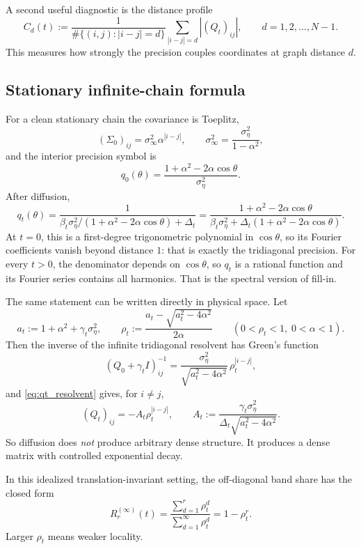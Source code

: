 \documentclass[11pt]{article}
\newcommand{\Id}{I}
\newcommand{\abs}[1]{\left| #1 \right|}
\begin{document}
A second useful diagnostic is the distance profile
\begin{equation}\label{eq:Cd_def}
C_d(t):=
\frac{1}{\#\{(i,j):\abs{i-j}=d\}}
\sum_{\abs{i-j}=d}\abs{(Q_t)_{ij}},
\qquad d=1,2,\dots,N-1.
\end{equation}
This measures how strongly the precision couples coordinates at graph distance $d$.

\subsection{Stationary infinite-chain formula}
For a clean stationary chain the covariance is Toeplitz,
\[
(\Sigma_0)_{ij}=\sigma_\infty^2\alpha^{\abs{i-j}},
\qquad
\sigma_\infty^2=\frac{\sigma_\eta^2}{1-\alpha^2},
\]
and the interior precision symbol is
\[
q_0(\theta)=\frac{1+\alpha^2-2\alpha\cos\theta}{\sigma_\eta^2}.
\]
After diffusion,
\begin{equation}\label{eq:qt_symbol}
q_t(\theta)=\frac{1}{\beta_t\sigma_\eta^2/(1+\alpha^2-2\alpha\cos\theta)+\Delta_t}
=
\frac{1+\alpha^2-2\alpha\cos\theta}{\beta_t\sigma_\eta^2+\Delta_t(1+\alpha^2-2\alpha\cos\theta)}.
\end{equation}
At $t=0$, this is a first-degree trigonometric polynomial in $\cos\theta$, so its Fourier coefficients vanish beyond distance $1$: that is exactly the tridiagonal precision. For every $t>0$, the denominator depends on $\cos\theta$, so $q_t$ is a rational function and its Fourier series contains all harmonics. That is the spectral version of fill-in.

The same statement can be written directly in physical space. Let
\[
a_t:=1+\alpha^2+\gamma_t\sigma_\eta^2,
\qquad
\rho_t:=\frac{a_t-\sqrt{a_t^2-4\alpha^2}}{2\alpha}
\qquad (0<\rho_t<1,\;0<\alpha<1).
\]
Then the inverse of the infinite tridiagonal resolvent has Green's function
\[
(Q_0+\gamma_t\Id)^{-1}_{ij}
=
\frac{\sigma_\eta^2}{\sqrt{a_t^2-4\alpha^2}}\,\rho_t^{\abs{i-j}},
\]
and \eqref{eq:qt_resolvent} gives, for $i\ne j$,
\begin{equation}\label{eq:qt_geometric}
(Q_t)_{ij}=-A_t\rho_t^{\abs{i-j}},
\qquad
A_t:=\frac{\gamma_t\sigma_\eta^2}{\Delta_t\sqrt{a_t^2-4\alpha^2}}.
\end{equation}
So diffusion does \emph{not} produce arbitrary dense structure. It produces a dense matrix with controlled exponential decay.

In this idealized translation-invariant setting, the off-diagonal band share has the closed form
\begin{equation}\label{eq:Rr_rho}
R_r^{(\infty)}(t)=
\frac{\sum_{d=1}^r \rho_t^d}{\sum_{d=1}^{\infty}\rho_t^d}
=1-\rho_t^r.
\end{equation}
Larger $\rho_t$ means weaker locality.
\end{document}
